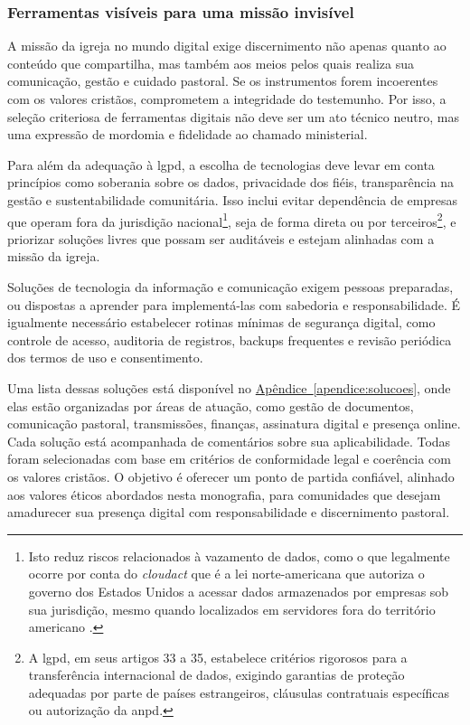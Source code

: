 \subsubsection{Ferramentas visíveis para uma missão invisível}

A missão da igreja no mundo digital exige discernimento não apenas quanto ao conteúdo que compartilha, mas também aos meios pelos quais realiza sua comunicação, gestão e cuidado pastoral. Se os instrumentos forem incoerentes com os valores cristãos, comprometem a integridade do testemunho. Por isso, a seleção criteriosa de ferramentas digitais não deve ser um ato técnico neutro, mas uma expressão de mordomia e fidelidade ao chamado ministerial.

Para além da adequação à \gls{lgpd}, a escolha de tecnologias deve levar em conta princípios como soberania sobre os dados, privacidade dos fiéis, transparência na gestão e sustentabilidade comunitária. Isso inclui evitar dependência de empresas que operam fora da jurisdição nacional\footnote{Isto reduz riscos relacionados à vazamento de dados, como o que legalmente ocorre por conta do \textit{\gls{cloudact}} que é a lei norte-americana que autoriza o governo dos Estados Unidos a acessar dados armazenados por empresas sob sua jurisdição, mesmo quando localizados em servidores fora do território americano \cite{harvard_cloudact_2018,brooklyn_cloudact_2020}.}, seja de forma direta ou por terceiros\footnote{A \gls{lgpd}, em seus artigos 33 a 35, estabelece critérios rigorosos para a transferência internacional de dados, exigindo garantias de proteção adequadas por parte de países estrangeiros, cláusulas contratuais específicas ou autorização da \gls{anpd}.}, e priorizar soluções livres que possam ser auditáveis e estejam alinhadas com a missão da igreja.

Soluções de tecnologia da informação e comunicação exigem pessoas preparadas, ou dispostas a aprender para implementá-las com sabedoria e responsabilidade. É igualmente necessário estabelecer rotinas mínimas de segurança digital, como controle de acesso, auditoria de registros, backups frequentes e revisão periódica dos termos de uso e consentimento.

Uma lista dessas soluções está disponível no \hyperref[apendice:solucoes]{Apêndice~\ref*{apendice:solucoes}}, onde elas estão organizadas por áreas de atuação, como gestão de documentos, comunicação pastoral, transmissões, finanças, assinatura digital e presença online. Cada solução está acompanhada de comentários sobre sua aplicabilidade. Todas foram selecionadas com base em critérios de conformidade legal e coerência com os valores cristãos. O objetivo é oferecer um ponto de partida confiável, alinhado aos valores éticos abordados nesta monografia, para comunidades que desejam amadurecer sua presença digital com responsabilidade e discernimento pastoral.

